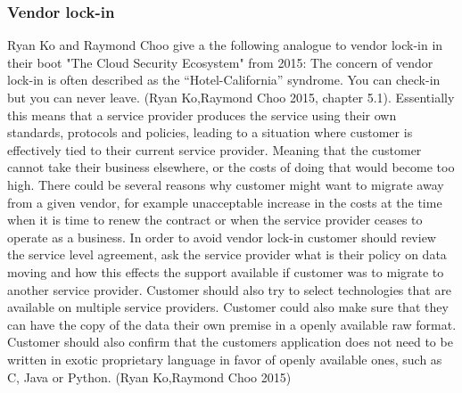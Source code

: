 \documentclass{article}
\begin{document}
\subsubsection{Vendor lock-in}
Ryan Ko and Raymond Choo give a the following analogue to vendor lock-in in their boot "The Cloud Security Ecosystem" from 2015: The concern of vendor lock-in is often described as the “Hotel-California” syndrome. You can check-in but you can never leave. (Ryan Ko,Raymond Choo 2015, chapter 5.1).
Essentially this means that a service provider produces the service using their own standards, protocols and policies, leading to a situation where customer is effectively tied to their current service provider. Meaning that the customer cannot take their business elsewhere, or the costs of doing that would become too high. There could be several reasons why customer might want to migrate away from a given vendor, for example unacceptable increase in the costs at the time when it is time to renew the contract or when the service provider ceases to operate as a business. In order to avoid vendor lock-in customer should review the service level agreement, ask the service provider what is their policy on data moving and how this effects the support available if customer was to migrate to another service provider. Customer should also try to select technologies that are available on multiple service providers. Customer could also make sure that they can have the copy of the data their own premise in a openly available raw format. Customer should also confirm that the customers application does not need to be written in exotic proprietary language in favor of openly available ones, such as C, Java or Python. (Ryan Ko,Raymond Choo 2015)
\end{document}
